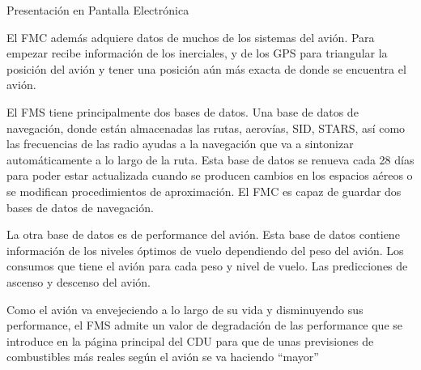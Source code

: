 \documentclass[10pt]{beamer}
\begin{document}
\begin{frame}{Presentaci\'on en Pantalla Electr\'onica}
{\small
El FMC adem\'as adquiere datos de muchos de los sistemas del avi\'on. Para empezar recibe informaci\'on de los inerciales, y de los GPS para triangular la posici\'on del avi\'on y tener una posici\'on a\'un m\'as exacta de donde se encuentra el avi\'on.

El FMS tiene principalmente dos bases de datos. Una base de datos de navegaci\'on, donde est\'an almacenadas las rutas, aerov\'ias, SID, STARS, as\'i como las frecuencias de las radio ayudas a la navegaci\'on que va a sintonizar autom\'aticamente a lo largo de la ruta. Esta base de datos se renueva cada 28 d\'ias para poder estar actualizada cuando se producen cambios en los espacios a\'ereos o se modifican procedimientos de aproximaci\'on. El FMC es capaz de guardar dos bases de datos de navegaci\'on.

La otra base de datos es de performance del avi\'on. Esta base de datos contiene informaci\'on de los niveles \'optimos de vuelo dependiendo del peso del avi\'on. Los consumos que tiene el avi\'on para cada peso y nivel de vuelo. Las predicciones de ascenso y descenso del avi\'on.

Como el avi\'on va envejeciendo a lo largo de su vida y disminuyendo sus performance, el FMS admite un valor de degradaci\'on de las performance que se introduce en la p\'agina principal del CDU para que de unas previsiones de combustibles m\'as reales seg\'un el avi\'on se va haciendo ``mayor''
}
\end{frame}
\end{document}
